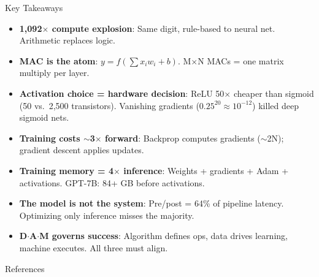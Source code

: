 \documentclass[aspectratio=169, 12pt]{beamer}
\begin{document}
\begin{frame}{Key Takeaways}

\scriptsize
\begin{itemize}\setlength\itemsep{0pt}
  \item \textbf{1,092$\times$ compute explosion}: Same digit, rule-based to neural net. Arithmetic replaces logic.
  \item \textbf{MAC is the atom}: $y = f(\sum x_i w_i + b)$. M$\times$N MACs = one matrix multiply per layer.
  \item \textbf{Activation choice = hardware decision}: ReLU 50$\times$ cheaper than sigmoid (50 vs.\ 2,500 transistors). Vanishing gradients ($0.25^{20} \approx 10^{-12}$) killed deep sigmoid nets.
  \item \textbf{Training costs $\sim$3$\times$ forward}: Backprop computes gradients ($\sim$2N); gradient descent applies updates.
  \item \textbf{Training memory = 4$\times$ inference}: Weights + gradients + Adam + activations. GPT-7B: 84+ GB before activations.
  \item \textbf{The model is not the system}: Pre/post = 64\% of pipeline latency. Optimizing only inference misses the majority.
  \item \textbf{D$\cdot$A$\cdot$M governs success}: Algorithm defines ops, data drives learning, machine executes. All three must align.
\end{itemize}

\end{frame}

\begin{frame}{References}

\footnotesize
{}

\end{frame}
\end{document}
